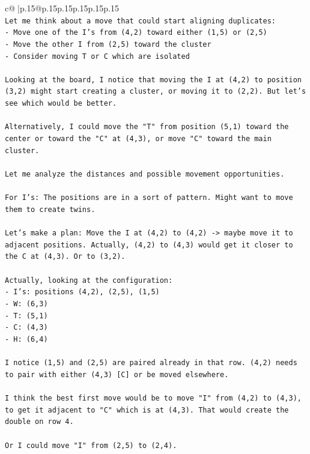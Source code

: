 \documentclass{article}
\begin{document}
{\begin{supertabular}{c@{$\;$}|p{.15\linewidth}@{}p{.15\linewidth}p{.15\linewidth}p{.15\linewidth}p{.15\linewidth}p{.15\linewidth}}
{{{\\ 
\texttt{Let me think about a move that could start aligning duplicates:} \\
\texttt{{-} Move one of the I's from (4,2) toward either (1,5) or (2,5)} \\
\texttt{{-} Move the other I from (2,5) toward the cluster} \\
\texttt{{-} Consider moving T or C which are isolated} \\
\\ 
\texttt{Looking at the board, I notice that moving the I at (4,2) to position (3,2) might start creating a cluster, or moving it to (2,2). But let's see which would be better.} \\
\\ 
\texttt{Alternatively, I could move the "T" from position (5,1) toward the center or toward the "C" at (4,3), or move "C" toward the main cluster.} \\
\\ 
\texttt{Let me analyze the distances and possible movement opportunities.} \\
\\ 
\texttt{For I's: The positions are in a sort of pattern. Might want to move them to create twins.} \\
\\ 
\texttt{Let's make a plan: Move the I at (4,2) to (4,2) {-}> maybe move it to adjacent positions. Actually, (4,2) to (4,3) would get it closer to the C at (4,3). Or to (3,2).} \\
\\ 
\texttt{Actually, looking at the configuration:} \\
\texttt{{-} I's: positions (4,2), (2,5), (1,5)} \\
\texttt{{-} W: (6,3)} \\
\texttt{{-} T: (5,1)} \\
\texttt{{-} C: (4,3)} \\
\texttt{{-} H: (6,4)} \\
\\ 
\texttt{I notice (1,5) and (2,5) are paired already in that row. (4,2) needs to pair with either (4,3) {[}C{]} or be moved elsewhere.} \\
\\ 
\texttt{I think the best first move would be to move "I" from (4,2) to (4,3), to get it adjacent to "C" which is at (4,3). That would create the double on row 4.} \\
\\ 
\texttt{Or I could move "I" from (2,5) to (2,4).} \\
}}}
\end{supertabular}}
\end{document}

